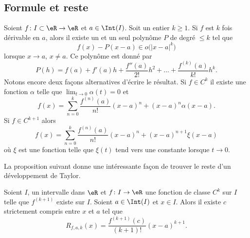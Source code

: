 \subsection{Formule et reste}

\begin{proposition}     \label{PropDevTaylorPol}
    Soient $f\colon I\subset\eR\to \eR$ et $a\in\Int(I)$. Soit un entier $k\geq 1$. Si $f$ est $k$ fois dérivable en $a$, alors il existe un et un seul polynôme $P$ de degré $\leq k$ tel que
    \begin{equation}
        f(x)-P(x-a)\in o\big( | x-a |^k \big)
    \end{equation}
    lorsque $x\to a$, $x\neq a$. Ce polynôme  est donné par
    \begin{equation}
        P(h)=f(a)+f'(a)h+\frac{ f''(a) }{ 2! }h^2+\ldots+\frac{ f^{(k)}(a) }{ k! }h^k.
    \end{equation}
    Notons encore deux façons alternatives d'écrire le résultat. Si \( f\in C^k\) il existe une fonction \( \alpha\) telle que \( \lim_{t\to 0} \alpha(t)=0\) et
    \begin{equation}
        f(x)=\sum_{n=0}^k\frac{ f^{(n)}(a) }{ n! }(x-a)^n+(x-a)^n\alpha(x-a).
    \end{equation}
    Si \( f\in C^{k+1}\) alors
    \begin{equation}        \label{EquQtpoN}
        f(x)=\sum_{n=0}^k\frac{ f^{(n)}(a) }{ n! }(x-a)^n+(x-a)^{n+1}\xi(x-a)
    \end{equation}
    où \( \xi\) est une fonction telle que \( \xi(t)\) tend vers une constante lorsque \( t\to 0\).
\end{proposition}

La proposition suivant donne une intéressante façon de trouver le reste d'un développement de Taylor.
\begin{proposition}     \label{PropResteTaylorc}
Soient $I$, un intervalle dans $\eR$ et $f\colon I\to \eR$ une fonction de classe $C^k$ sur $I$ telle que $f^{(k+1)}$ existe sur $I$. Soient $a\in\Int(I)$ et $x\in I$. Alors il existe $c$ strictement compris entre $x$ et $a$ tel que 
\begin{equation}
    R_{f,a,k}(x)=\frac{ f^{(k+1)}(c) }{ (k+1)! }(x-a)^{k+1}.
\end{equation}
\end{proposition}


